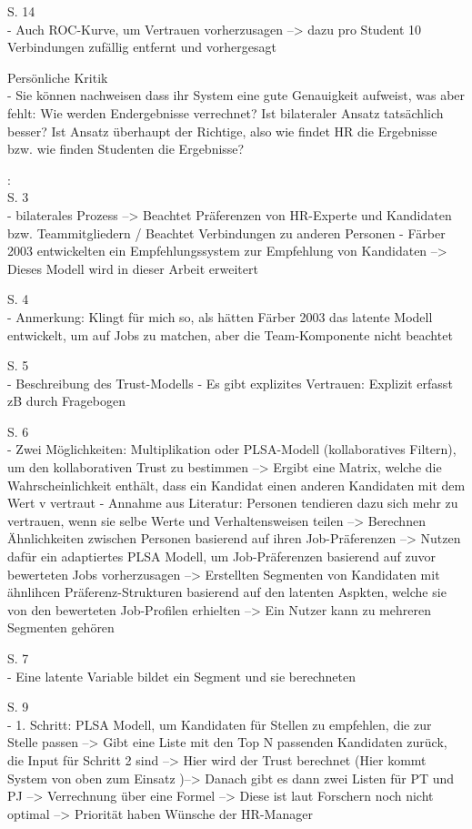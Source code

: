 S. 14\\
- Auch ROC-Kurve, um Vertrauen vorherzusagen --> dazu pro Student 10 Verbindungen zufällig entfernt und vorhergesagt

Persönliche Kritik\\
- Sie können nachweisen dass ihr System eine gute Genauigkeit aufweist, was aber fehlt: Wie werden Endergebnisse verrechnet? Ist bilateraler Ansatz tatsächlich besser? Ist Ansatz überhaupt der Richtige, also wie findet HR die Ergebnisse bzw. wie finden Studenten die Ergebnisse?

\textcite{malinowski:2005}:\\
S. 3\\
- bilaterales Prozess --> Beachtet Präferenzen von HR-Experte und Kandidaten bzw. Teammitgliedern / Beachtet Verbindungen zu anderen Personen
- Färber 2003 entwickelten ein Empfehlungssystem zur Empfehlung von Kandidaten --> Dieses Modell wird in dieser Arbeit erweitert

S. 4\\
- Anmerkung: Klingt für mich so, als hätten Färber 2003 das latente Modell entwickelt, um auf Jobs zu matchen, aber die Team-Komponente nicht beachtet

S. 5\\
- Beschreibung des Trust-Modells
- Es gibt explizites Vertrauen: Explizit erfasst zB durch Fragebogen

S. 6\\
- Zwei Möglichkeiten: Multiplikation oder PLSA-Modell (kollaboratives Filtern), um den kollaborativen Trust zu bestimmen --> Ergibt eine Matrix, welche die Wahrscheinlichkeit enthält, dass ein Kandidat einen anderen Kandidaten mit dem Wert v vertraut
- Annahme aus Literatur: Personen tendieren dazu sich mehr zu vertrauen, wenn sie selbe Werte und Verhaltensweisen teilen --> Berechnen Ähnlichkeiten zwischen Personen basierend auf ihren Job-Präferenzen --> Nutzen dafür ein adaptiertes PLSA Modell, um Job-Präferenzen basierend auf zuvor bewerteten Jobs vorherzusagen --> Erstellten Segmenten von Kandidaten mit ähnlihcen Präferenz-Strukturen basierend auf den latenten Aspkten, welche sie von den bewerteten Job-Profilen erhielten --> Ein Nutzer kann zu mehreren Segmenten gehören

S. 7\\
- Eine latente Variable bildet ein Segment und sie berechneten

S. 9\\
- 1. Schritt: PLSA Modell, um Kandidaten für Stellen zu empfehlen, die zur Stelle passen --> Gibt eine Liste mit den Top N passenden Kandidaten zurück, die Input für Schritt 2 sind --> Hier wird der Trust berechnet (Hier kommt System von oben zum Einsatz )--> Danach gibt es dann zwei Listen für PT und PJ --> Verrechnung über eine Formel --> Diese ist laut Forschern noch nicht optimal --> Priorität haben Wünsche der HR-Manager

